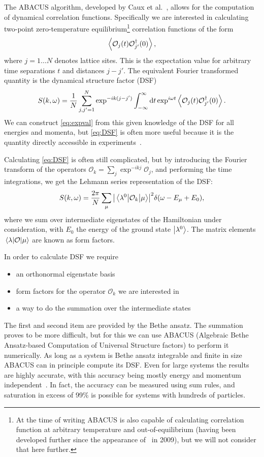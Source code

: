 \documentclass[11pt, a4paper]{report} %
\newcommand{\operator}{\mathcal{O}}
\begin{document}
The ABACUS algorithm, developed by Caux et al.~\cite{Caux2005, Caux2007, Caux2007a, Caux2005a}, allows for the computation of dynamical correlation functions.
Specifically we are interested in calculating two-point zero-temperature equilibrium\footnote{At the time of writing ABACUS is also capable of calculating correlation function at arbitrary temperature and out-of-equilibrium (having been developed further since the appearance of~\cite{Caux2009} in 2009), but we will not consider that here further.} correlation functions of the form
\begin{equation}\label{eq:expval}
	\expval{\operator_j(t)\operator_{j'}^{\dagger}(0)},
\end{equation}
where \(j=1\ldots N\) denotes lattice sites.
This is the expectation value for arbitrary time separations $t$ and distances $j-j'$.
The equivalent Fourier transformed quantity is the dynamical structure factor (DSF)
\begin{equation}\label{eq:DSF}
	S(k,\omega) = \frac{1}{N} \sum_{j,j'=1}^{N} \exp^{-ik(j-j')} \int_{-\infty}^{\infty}\dd t \exp^{i\omega t}\expval{\operator_j(t)\operator_{j'}^{\dagger}(0)}.
\end{equation}
We can construct \cref{eq:expval} from this given knowledge of the DSF for all energies and momenta, but \cref{eq:DSF} is often more useful because it is the quantity directly accessible in experiments~\cite{Caux2009,Caux2007a}.

Calculating \cref{eq:DSF} is often still complicated, but by introducing the Fourier transform of the operators $\mathcal{O}_k=\sum_j \exp^{-ikj} \mathcal{O}_j$, and performing the time integrations, we get the Lehmann series representation of the DSF:
\begin{equation}
  S(k,\omega) = \frac{2\pi}{N}\sum_{\mu}\abs{\mel{\lambda^0}{\mathcal{O}_k}{\mu}}^2 \delta(\omega-E_{\mu}+E_0), 
\end{equation}
where we sum over intermediate eigenstates of the Hamiltonian under consideration, with $E_0$ the energy of the ground state $\ket{\lambda^0}$.
The matrix elements $\mel{\lambda}{\mathcal{O}}{\mu}$ are known as form factors.

In order to calculate DSF we require
\begin{itemize}
  \item an orthonormal eigenstate basis
  \item form factors for the operator $\mathcal{O}_k$ we are interested in
  \item a way to do the summation over the intermediate states
\end{itemize}
The first and second item are provided by the Bethe ansatz.
The summation proves to be more difficult, but for this we can use ABACUS (Algebraic Bethe Ansatz-based Computation of Universal Structure factors) to perform it numerically.
As long as a system is Bethe ansatz integrable and finite in size ABACUS can in principle compute its DSF.
Even for large systems the results are highly accurate, with this accuracy being mostly energy and momentum independent~\cite{Caux2009}.
In fact, the accuracy can be measured using sum rules, and saturation in excess of 99\% is possible for systems with hundreds of particles.
\end{document}
